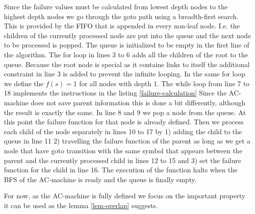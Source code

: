\documentclass[english,twoside,censored,csm,algorithms-track-2020]{HYthesisML}
\theoremstyle{plain}
\theoremstyle{definition}
\begin{document}
  Since the failure values must be calculated from lowest depth nodes to the highest depth nodes
  we go through the goto path using a breadth-first search. This is provided by the FIFO that is
  appended in every non-leaf node. I.e. the children of the currently processed node are put into the
  queue and the next node to be processed is popped. The queue is initialized to be empty in the first
  line of the algorithm. The for loop in lines 3 to 6 adds all the children of the root to the queue.
  Because the root node is special as it contains links to itself the additional constraint
  in line 3 is added to prevent the infinite looping. In the same for loop we define the
  $f(s)=1$ for all nodes with depth 1. The while loop from line 7 to 18 implements the instructions
  in the listing \ref{failure-calculation} Since the AC-machine does not save parent information
  this is done a bit differently, although the result is exactly the same. In line 8 and 9 we pop a
  node from the queue. At this point the failure function for that node is already defined. Then we
  process each child of the node separately in lines 10 to 17 by 1) adding the child to the queue
  in line 11  2) travelling the failure function of the parent as long as we get a node that have goto
  transition with the same symbol that appears between the parent and the currently processed child
  in lines 12 to 15 and  3) set the failure function for the child in line 16. The execution of the
  function halts when the BFS of the  AC-machine is ready and the queue is finally empty.


  For now, as the AC-machine is fully defined we focus on the important property it can be used as
  the lemma \ref{lem-overlap} suggests.
\end{document}
